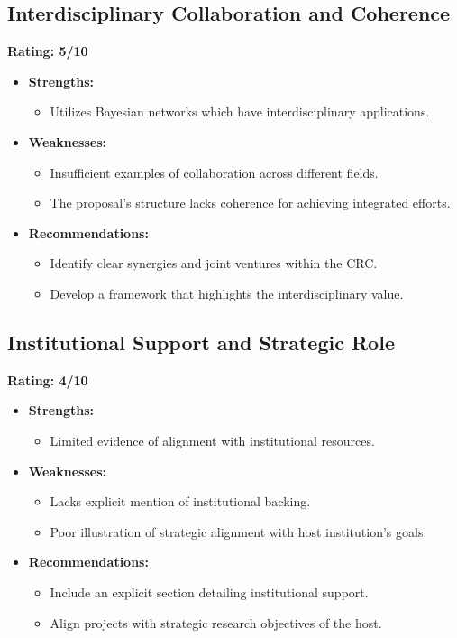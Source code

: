 \documentclass{article}
\begin{document}
\subsection{Interdisciplinary Collaboration and Coherence}
\textbf{Rating: 5/10}
\begin{itemize}
    \item \textbf{Strengths:}
        \begin{itemize}
            \item Utilizes Bayesian networks which have interdisciplinary applications.
        \end{itemize}
    \item \textbf{Weaknesses:}
        \begin{itemize}
            \item Insufficient examples of collaboration across different fields.
            \item The proposal's structure lacks coherence for achieving integrated efforts.
        \end{itemize}
    \item \textbf{Recommendations:}
        \begin{itemize}
            \item Identify clear synergies and joint ventures within the CRC.
            \item Develop a framework that highlights the interdisciplinary value.
        \end{itemize}
\end{itemize}

\subsection{Institutional Support and Strategic Role}
\textbf{Rating: 4/10}
\begin{itemize}
    \item \textbf{Strengths:}
        \begin{itemize}
            \item Limited evidence of alignment with institutional resources.
        \end{itemize}
    \item \textbf{Weaknesses:}
        \begin{itemize}
            \item Lacks explicit mention of institutional backing.
            \item Poor illustration of strategic alignment with host institution's goals.
        \end{itemize}
    \item \textbf{Recommendations:}
        \begin{itemize}
            \item Include an explicit section detailing institutional support.
            \item Align projects with strategic research objectives of the host.
        \end{itemize}
\end{itemize}
\end{document}
